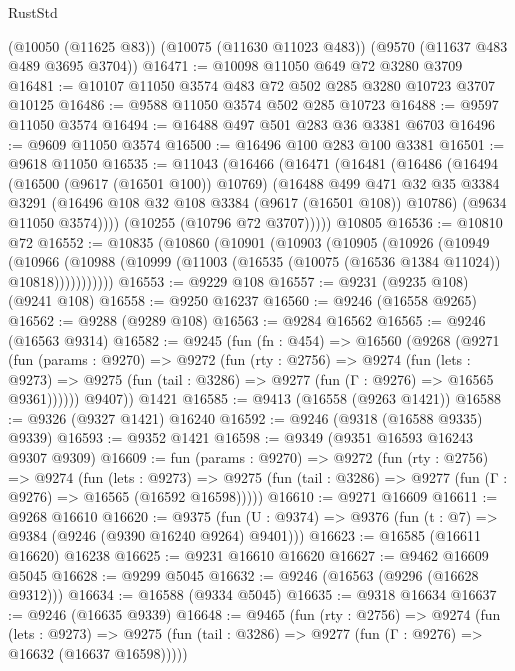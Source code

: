 \begin{lexlean}{RustStd}
\begin{coremodule}
    (@10050 (@11625 @83))
    (@10075 (@11630 @11023 @483))
    (@9570 (@11637 @483 @489 @3695 @3704))
@16471 := @10098 @11050 @649 @72 @3280 @3709
@16481 := @10107 @11050 @3574 @483 @72 @502 @285 @3280 @10723 @3707 @10125
@16486 := @9588 @11050 @3574 @502 @285 @10723
@16488 := @9597 @11050 @3574
@16494 := @16488 @497 @501 @283 @36 @3381 @6703
@16496 := @9609 @11050 @3574
@16500 := @16496 @100 @283 @100 @3381
@16501 := @9618 @11050
@16535 := @11043
    (@16466
      (@16471
        (@16481
          (@16486
            (@16494
              (@16500 (@9617 (@16501 @100)) @10769)
              (@16488
                @499
                @471
                @32
                @35
                @3384
                @3291
                (@16496 @108 @32 @108 @3384 (@9617 (@16501 @108)) @10786)
                (@9634 @11050 @3574))))
          (@10255 (@10796 @72 @3707)))))
    @10805
@16536 := @10810 @72
@16552 := @10835
    (@10860
      (@10901
        (@10903
          (@10905
            (@10926
              (@10949
                (@10966
                  (@10988 (@10999 (@11003 (@16535 (@10075 (@16536 @1384 @11024)) @10818)))))))))))
@16553 := @9229 @108
@16557 := @9231 (@9235 @108) (@9241 @108)
@16558 := @9250 @16237
@16560 := @9246 (@16558 @9265)
@16562 := @9288 (@9289 @108)
@16563 := @9284 @16562
@16565 := @9246 (@16563 @9314)
@16582 := @9245
    (fun (fn : @454) =>
    @16560
      (@9268
        (@9271
          (fun (params : @9270) =>
          @9272
            (fun (rty : @2756) =>
            @9274
              (fun (lets : @9273) =>
              @9275 (fun (tail : @3286) => @9277 (fun (Γ : @9276) => @16565 @9361))))))
        @9407))
    @1421
@16585 := @9413 (@16558 (@9263 @1421))
@16588 := @9326 (@9327 @1421) @16240
@16592 := @9246 (@9318 (@16588 @9335) @9339)
@16593 := @9352 @1421
@16598 := @9349 (@9351 @16593 @16243 @9307 @9309)
@16609 := fun (params : @9270) =>
  @9272
    (fun (rty : @2756) =>
    @9274
      (fun (lets : @9273) =>
      @9275 (fun (tail : @3286) => @9277 (fun (Γ : @9276) => @16565 (@16592 @16598)))))
@16610 := @9271 @16609
@16611 := @9268 @16610
@16620 := @9375
    (fun (U : @9374) => @9376 (fun (t : @7) => @9384 (@9246 (@9390 @16240 @9264) @9401)))
@16623 := @16585 (@16611 @16620) @16238
@16625 := @9231 @16610 @16620
@16627 := @9462 @16609 @5045
@16628 := @9299 @5045
@16632 := @9246 (@16563 (@9296 (@16628 @9312)))
@16634 := @16588 (@9334 @5045)
@16635 := @9318 @16634
@16637 := @9246 (@16635 @9339)
@16648 := @9465
    (fun (rty : @2756) =>
    @9274
      (fun (lets : @9273) =>
      @9275 (fun (tail : @3286) => @9277 (fun (Γ : @9276) => @16632 (@16637 @16598)))))

\end{coremodule}
\end{lexlean}
